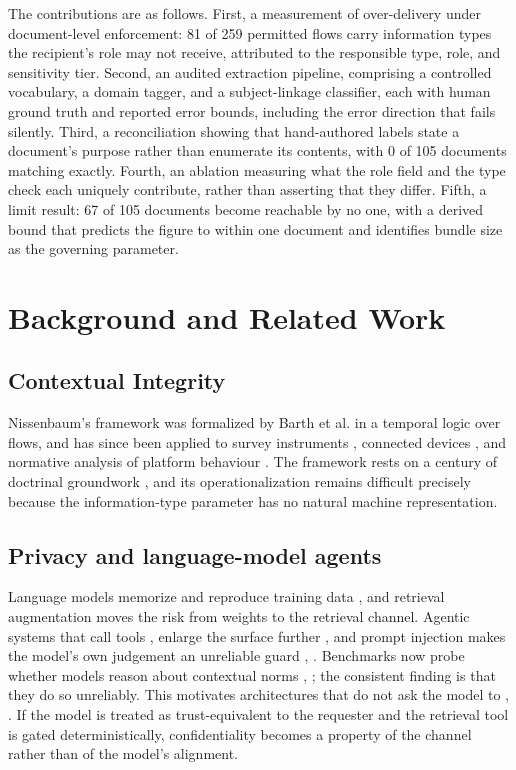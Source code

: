 \documentclass[conference]{IEEEtran}
\begin{document}
The contributions are as follows. First, a measurement of over-delivery under
document-level enforcement: 81 of 259 permitted flows carry information types the
recipient's role may not receive, attributed to the responsible type, role, and
sensitivity tier. Second, an audited extraction pipeline, comprising a
controlled vocabulary, a domain tagger, and a subject-linkage classifier, each
with human ground truth and reported error bounds, including the error direction
that fails silently. Third, a reconciliation showing that hand-authored labels
state a document's purpose rather than enumerate its contents, with 0 of 105
documents matching exactly. Fourth, an ablation measuring what the role field
and the type check each uniquely contribute, rather than asserting that they
differ. Fifth, a limit result: 67 of 105 documents become reachable by no one,
with a derived bound that predicts the figure to within one document and
identifies bundle size as the governing parameter.

\section{Background and Related Work}

\subsection{Contextual Integrity}
Nissenbaum's framework \cite{b1} was formalized by Barth et al. \cite{b2} in a
temporal logic over flows, and has since been applied to survey instruments
\cite{b5}, connected devices \cite{b6}, and normative analysis of platform
behaviour \cite{b7}. The framework rests on a century of doctrinal groundwork
\cite{b8}, and its operationalization remains difficult precisely because the
information-type parameter has no natural machine representation.

\subsection{Privacy and language-model agents}
Language models memorize and reproduce training data \cite{b9}, and retrieval
augmentation \cite{b10} moves the risk from weights to the retrieval channel.
Agentic systems that call tools \cite{b11}, \cite{b12} enlarge the surface
further \cite{b13}, and prompt injection makes the model's own judgement an
unreliable guard \cite{b14}, \cite{b15}. Benchmarks now probe whether models
reason about contextual norms \cite{b16}, \cite{b17}; the consistent finding is
that they do so unreliably. This motivates architectures that do not ask the
model to \cite{b18}, \cite{b19}. If the model is treated as trust-equivalent to
the requester and the retrieval tool is gated deterministically, confidentiality
becomes a property of the channel rather than of the model's alignment.
\end{document}
